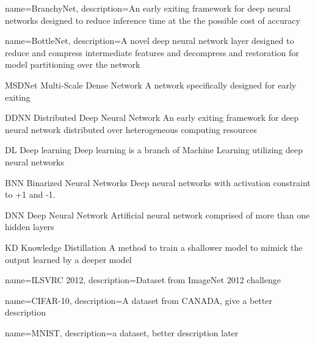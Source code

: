 {
	name={BranchyNet},
	description={An early exiting framework for deep neural networks designed to reduce inference time at the the possible cost of accuracy}
}

{
	name={BottleNet},
	description={A novel deep neural network layer designed to reduce and compress intermediate features and decompress and restoration for model partitioning over the network}
}

	{MSDNet}
	{Multi-Scale Dense Network}
	{A network specifically designed for early exiting}
	
	
	{DDNN}
	{Distributed Deep Neural Network}
	{An early exiting framework for deep neural network distributed over heterogeneous computing resources}
	
	{DL}
	{Deep learning}
	{Deep learning is a branch of Machine Learning utilizing deep neural networks}
	
	{BNN}
	{Binarized Neural Networks}
	{Deep neural networks with activation constraint to +1 and -1.}
	
	{DNN}
	{Deep Neural Network}
	{Artificial neural network comprised of more than one hidden layers}
	
	{KD}
	{Knowledge Distillation}
	{A method to train a shallower model to mimick the output learned by a deeper model}
	

{
	name={ILSVRC 2012},
	description={Dataset from ImageNet 2012 challenge}
}

{
	name={CIFAR-10},
	description={A dataset from CANADA, give a better description}
}

{
	name={MNIST},
	description={a dataset, better description later}
}


